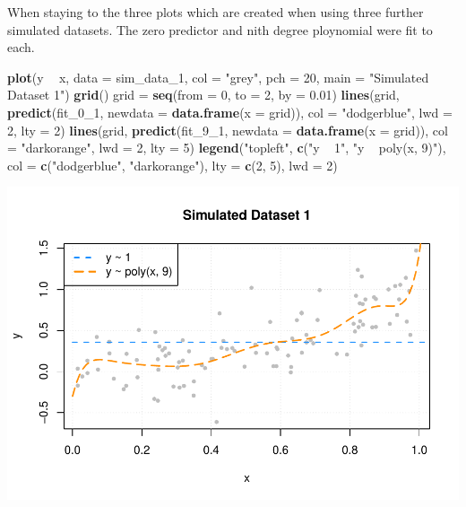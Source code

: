 \documentclass[]{report}
\newenvironment{Shaded}{\begin{snugshade}}{\end{snugshade}}
\newcommand{\KeywordTok}[1]{\textcolor[rgb]{0.13,0.29,0.53}{\textbf{#1}}}
\newcommand{\DataTypeTok}[1]{\textcolor[rgb]{0.13,0.29,0.53}{#1}}
\newcommand{\DecValTok}[1]{\textcolor[rgb]{0.00,0.00,0.81}{#1}}
\newcommand{\FloatTok}[1]{\textcolor[rgb]{0.00,0.00,0.81}{#1}}
\newcommand{\StringTok}[1]{\textcolor[rgb]{0.31,0.60,0.02}{#1}}
\newcommand{\OperatorTok}[1]{\textcolor[rgb]{0.81,0.36,0.00}{\textbf{#1}}}
\newcommand{\NormalTok}[1]{#1}
\begin{document}
When staying to the three plots which are created when using three
further simulated datasets. The zero predictor and nith degree
ploynomial were fit to each.

\begin{Shaded}
\begin{Highlighting}[]
\KeywordTok{plot}\NormalTok{(y }\OperatorTok{~}\StringTok{ }\NormalTok{x, }\DataTypeTok{data =}\NormalTok{ sim_data_}\DecValTok{1}\NormalTok{, }\DataTypeTok{col =} \StringTok{"grey"}\NormalTok{, }\DataTypeTok{pch =} \DecValTok{20}\NormalTok{, }\DataTypeTok{main =} \StringTok{"Simulated Dataset 1"}\NormalTok{)}
\KeywordTok{grid}\NormalTok{()}
\NormalTok{grid =}\StringTok{ }\KeywordTok{seq}\NormalTok{(}\DataTypeTok{from =} \DecValTok{0}\NormalTok{, }\DataTypeTok{to =} \DecValTok{2}\NormalTok{, }\DataTypeTok{by =} \FloatTok{0.01}\NormalTok{)}
\KeywordTok{lines}\NormalTok{(grid, }\KeywordTok{predict}\NormalTok{(fit_0_}\DecValTok{1}\NormalTok{, }\DataTypeTok{newdata =} \KeywordTok{data.frame}\NormalTok{(}\DataTypeTok{x =}\NormalTok{ grid)), }\DataTypeTok{col =} \StringTok{"dodgerblue"}\NormalTok{, }\DataTypeTok{lwd =} \DecValTok{2}\NormalTok{, }\DataTypeTok{lty =} \DecValTok{2}\NormalTok{)}
\KeywordTok{lines}\NormalTok{(grid, }\KeywordTok{predict}\NormalTok{(fit_9_}\DecValTok{1}\NormalTok{, }\DataTypeTok{newdata =} \KeywordTok{data.frame}\NormalTok{(}\DataTypeTok{x =}\NormalTok{ grid)), }\DataTypeTok{col =} \StringTok{"darkorange"}\NormalTok{, }\DataTypeTok{lwd =} \DecValTok{2}\NormalTok{, }\DataTypeTok{lty =} \DecValTok{5}\NormalTok{)}
\KeywordTok{legend}\NormalTok{(}\StringTok{"topleft"}\NormalTok{, }\KeywordTok{c}\NormalTok{(}\StringTok{"y ~ 1"}\NormalTok{, }\StringTok{"y ~ poly(x, 9)"}\NormalTok{), }\DataTypeTok{col =} \KeywordTok{c}\NormalTok{(}\StringTok{"dodgerblue"}\NormalTok{, }\StringTok{"darkorange"}\NormalTok{), }\DataTypeTok{lty =} \KeywordTok{c}\NormalTok{(}\DecValTok{2}\NormalTok{, }\DecValTok{5}\NormalTok{), }\DataTypeTok{lwd =} \DecValTok{2}\NormalTok{)}
\end{Highlighting}
\end{Shaded}

\includegraphics{MyBook_files/figure-latex/unnamed-chunk-108-1.pdf}
\end{document}
